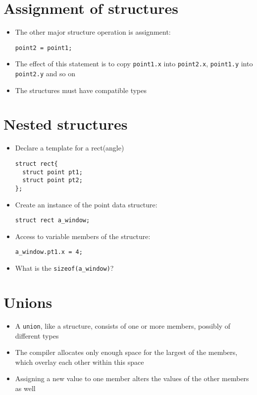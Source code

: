 \documentclass{article}
\begin{document}
\section{Assignment of structures}
\begin{itemize}
\item The other major structure operation is assignment:
\begin{verbatim}
point2 = point1;
\end{verbatim}

\item The effect of this statement is to copy \verb!point1.x! into \verb!point2.x!, \verb!point1.y! into \verb!point2.y! and so on

\item The structures must have compatible types

\end{itemize}



\section{Nested structures}
\begin{itemize}
\item Declare a template for a rect(angle)
\begin{verbatim}
struct rect{
  struct point pt1;
  struct point pt2;
};
\end{verbatim}

\item Create an instance of the point data structure:
\begin{verbatim}
struct rect a_window;
\end{verbatim}

\item Access to variable members of the structure:
\begin{verbatim}
a_window.pt1.x = 4;
\end{verbatim}

\item What is the \verb!sizeof(a_window)!?
\end{itemize}




\section{Unions}
\begin{itemize}
\item A \verb!union!, like a structure, consists of one or more members, possibly of different types

\item The compiler allocates only enough space for the largest of the members, which overlay each other within this space

\item Assigning a new value to one member alters the values of the other members as well
\end{itemize}
\end{document}
